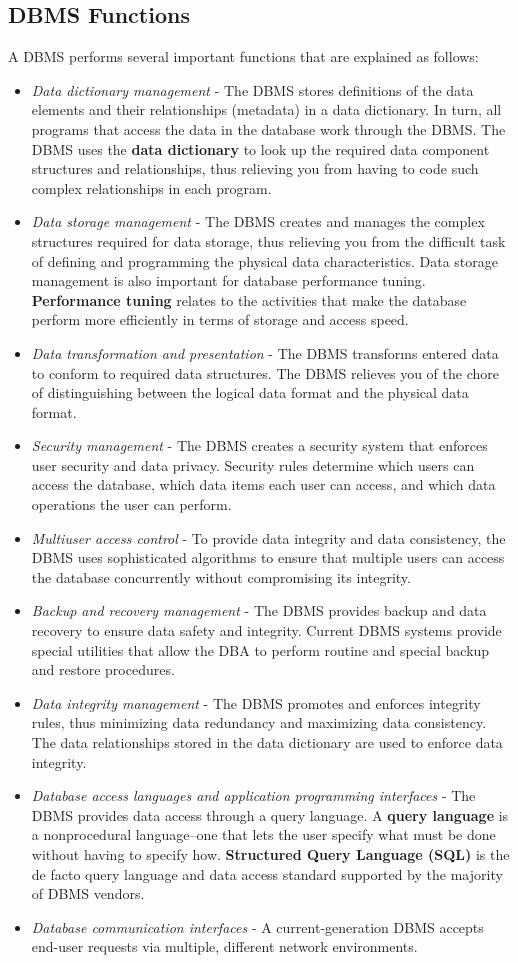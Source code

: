 \documentclass[a4paper, 12pt, titlepage]{report}
\begin{document}
\subsection{DBMS Functions}
A DBMS performs several important functions that are explained as follows:
\begin{itemize}
\item \emph{Data dictionary management} - The DBMS stores definitions of the data elements and their relationships (metadata) in a data dictionary. In turn, all programs that access
the data in the database work through the DBMS. The DBMS uses the \textbf{data dictionary} to look up the required data component structures and relationships, thus
relieving you from having to code such complex relationships in each program.
\item \emph{Data storage management} - The DBMS creates and manages the complex structures required for data storage, thus relieving you from the difficult task of defining and programming the physical data characteristics. Data storage management is also important for database performance tuning. \textbf{Performance tuning} relates to the activities that make the database perform more efficiently in terms of storage and access speed.
\item \emph{Data transformation and presentation} - The DBMS transforms entered data to conform to required data structures. The DBMS relieves you of the chore of distinguishing between the logical data format and the physical data format.
\item \emph{Security management} - The DBMS creates a security system that enforces user security and data privacy. Security rules determine which users can access the database, which data items each user can access, and which data operations the user can perform.
\item \emph{Multiuser access control} - To provide data integrity and data consistency, the DBMS uses sophisticated algorithms to ensure that multiple users can access the database
concurrently without compromising its integrity.
\item \emph{Backup and recovery management} - The DBMS provides backup and data recovery to ensure data safety and integrity. Current DBMS systems provide special utilities that allow the DBA to perform routine and special backup and restore procedures.
\item \emph{Data integrity management} - The DBMS promotes and enforces integrity rules, thus minimizing data redundancy and maximizing data consistency. The data relationships stored in the data dictionary are used to enforce data integrity.
\item \emph{Database access languages and application programming interfaces} - The DBMS provides data access through a query language. A \textbf{query language} is a nonprocedural language--one that lets the user specify what must be done without having to specify how. \textbf{Structured Query Language (SQL)} is the de facto query language and data access standard supported by the majority of DBMS vendors.
\item \emph{Database communication interfaces} - A current-generation DBMS accepts end-user requests via multiple, different network environments.
\end{itemize}
\end{document}
